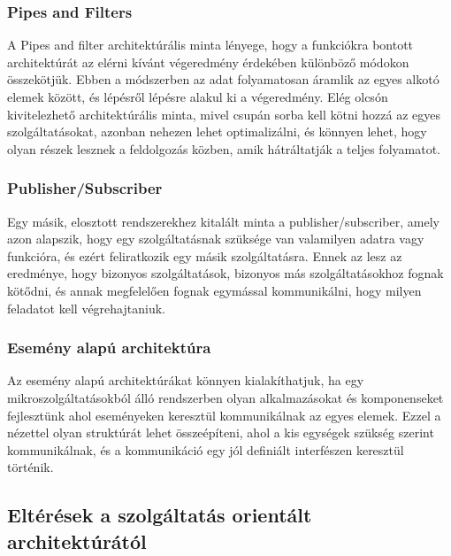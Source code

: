 \documentclass[11pt,magyar,a4paper,twoside,]{report}
\begin{document}
\subsubsection{Pipes and Filters}\label{pipes-and-filters}

A Pipes and filter architektúrális minta\citep{pipes-pattern} lényege,
hogy a funkciókra bontott architektúrát az elérni kívánt végeredmény
érdekében különböző módokon összekötjük. Ebben a módszerben az adat
folyamatosan áramlik az egyes alkotó elemek között, és lépésről lépésre
alakul ki a végeredmény. Elég olcsón kivitelezhető architektúrális
minta, mivel csupán sorba kell kötni hozzá az egyes szolgáltatásokat,
azonban nehezen lehet optimalizálni, és könnyen lehet, hogy olyan részek
lesznek a feldolgozás közben, amik hátráltatják a teljes folyamatot.

\subsubsection{Publisher/Subscriber}\label{publishersubscriber}

Egy másik, elosztott rendszerekhez kitalált minta a
publisher/subscriber\citep{pub-subscribed}, amely azon alapszik, hogy
egy szolgáltatásnak szüksége van valamilyen adatra vagy funkcióra, és
ezért feliratkozik egy másik szolgáltatásra. Ennek az lesz az eredménye,
hogy bizonyos szolgáltatások, bizonyos más szolgáltatásokhoz fognak
kötődni, és annak megfelelően fognak egymással kommunikálni, hogy milyen
feladatot kell végrehajtaniuk.

\subsubsection{Esemény alapú
architektúra}\label{esemuxe9ny-alapuxfa-architektuxfara}

Az esemény alapú architektúrákat\citep{event-driven-pattern} könnyen
kialakíthatjuk, ha egy mikroszolgáltatásokból álló rendszerben olyan
alkalmazásokat és komponenseket fejlesztünk ahol eseményeken keresztül
kommunikálnak az egyes elemek. Ezzel a nézettel olyan struktúrát lehet
összeépíteni, ahol a kis egységek szükség szerint kommunikálnak, és a
kommunikáció egy jól definiált interfészen keresztül történik.

\subsection{Eltérések a szolgáltatás orientált
architektúrától}\label{eltuxe9ruxe9sek-a-szolguxe1ltatuxe1s-orientuxe1lt-architektuxfaruxe1tuxf3l}
\end{document}
